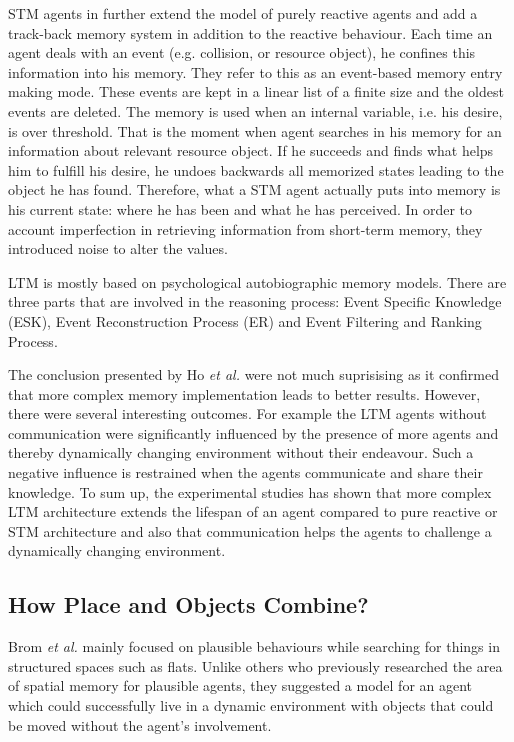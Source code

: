 STM agents in further extend the model of purely reactive agents and add a track-back memory system in addition to the reactive behaviour. Each time an agent deals with an event (e.g. collision, or resource object), he confines this information into his memory. They refer to this as an event-based memory entry making mode. These events are kept in a linear list of a finite size and the oldest events are deleted. The memory is used when an internal variable, i.e. his desire, is over threshold. That is the moment when agent searches in his memory for an information about relevant resource object. If he succeeds and finds what helps him to fulfill his desire, he undoes backwards all memorized states leading to the object he has found. Therefore, what a STM agent actually puts into memory is his current state: where he has been and what he has perceived. In order to account imperfection in retrieving information from short-term memory, they introduced noise to alter the values.

LTM is mostly based on psychological autobiographic memory models. There are three parts that are involved in the reasoning process: Event Specific Knowledge (ESK), Event Reconstruction Process (ER) and Event Filtering and Ranking Process.

The conclusion presented by Ho \textit{et al.} were not much suprisising as it confirmed that more complex memory implementation leads to better results. However, there were several interesting outcomes. For example the LTM agents without communication were significantly influenced by the presence of more agents and thereby dynamically changing environment without their endeavour. Such a negative influence is restrained when the agents communicate and share their knowledge. To sum up, the experimental studies has shown that more complex LTM architecture extends the lifespan of an agent compared to pure reactive or STM architecture and also that communication helps the agents to challenge a dynamically changing environment. 

\subsection{How Place and Objects Combine?}
\label{subsec:howplaceandobjectscombine}

Brom \textit{et al.} mainly focused on plausible behaviours while searching for things in structured spaces such as flats.\cite{Brom:placeandobjects} Unlike others who previously researched the area of spatial memory for plausible agents, they suggested a model for an agent which could successfully live in a dynamic environment with objects that could be moved without the agent’s involvement. 


